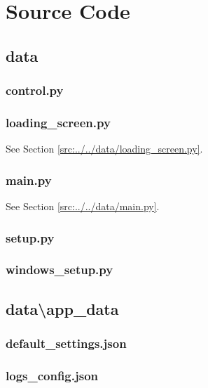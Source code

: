 \documentclass[../main/main.tex]{subfiles}
\begin{document}
\newpage

\chapter{Source Code}

\section{data}
\subsection{control.py}

\label{src:data/control.py}

\subsection{loading\_screen.py}
See Section \ref{src:../../data/loading_screen.py}.

\subsection{main.py}
See Section \ref{src:../../data/main.py}.

\subsection{setup.py}

\label{src:data/setup.py}

\subsection{windows\_setup.py}

\label{src:data/windows_setup.py}

\section{data\textbackslash app\_data}
\subsection{default\_settings.json}

\label{src:data/app_data/default_settings.json}

\subsection{logs\_config.json}

\label{src:data/app_data/logs_config.json}
\end{document}
